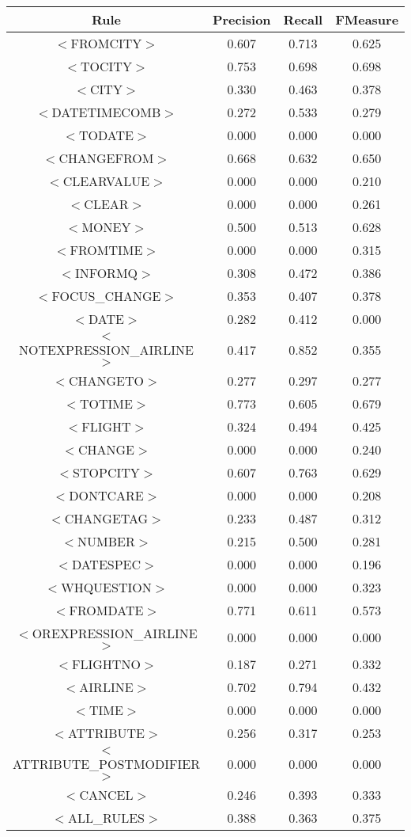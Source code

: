 \documentclass[a4paper,10pt]{article}
\begin{document}
\pagebreak
{} \label{tab:title} 
\begin{center}
\begin{tabular}{|c||c|c|c|}
\hline
Rule&Precision&Recall&FMeasure\\
\hline
\hline
$<$FROMCITY$>$&0.607&0.713&0.625 \\
\hline$<$TOCITY$>$&0.753&0.698&0.698 \\
\hline$<$CITY$>$&0.330&0.463&0.378 \\
\hline$<$DATETIMECOMB$>$&0.272&0.533&0.279 \\
\hline$<$TODATE$>$&0.000&0.000&0.000 \\
\hline$<$CHANGEFROM$>$&0.668&0.632&0.650 \\
\hline$<$CLEARVALUE$>$&0.000&0.000&0.210 \\
\hline$<$CLEAR$>$&0.000&0.000&0.261 \\
\hline$<$MONEY$>$&0.500&0.513&0.628 \\
\hline$<$FROMTIME$>$&0.000&0.000&0.315 \\
\hline$<$INFORMQ$>$&0.308&0.472&0.386 \\
\hline$<$FOCUS\_CHANGE$>$&0.353&0.407&0.378 \\
\hline$<$DATE$>$&0.282&0.412&0.000 \\
\hline$<$NOTEXPRESSION\_AIRLINE$>$&0.417&0.852&0.355 \\
\hline$<$CHANGETO$>$&0.277&0.297&0.277 \\
\hline$<$TOTIME$>$&0.773&0.605&0.679 \\
\hline$<$FLIGHT$>$&0.324&0.494&0.425 \\
\hline$<$CHANGE$>$&0.000&0.000&0.240 \\
\hline$<$STOPCITY$>$&0.607&0.763&0.629 \\
\hline$<$DONTCARE$>$&0.000&0.000&0.208 \\
\hline$<$CHANGETAG$>$&0.233&0.487&0.312 \\
\hline$<$NUMBER$>$&0.215&0.500&0.281 \\
\hline$<$DATESPEC$>$&0.000&0.000&0.196 \\
\hline$<$WHQUESTION$>$&0.000&0.000&0.323 \\
\hline$<$FROMDATE$>$&0.771&0.611&0.573 \\
\hline$<$OREXPRESSION\_AIRLINE$>$&0.000&0.000&0.000 \\
\hline$<$FLIGHTNO$>$&0.187&0.271&0.332 \\
\hline$<$AIRLINE$>$&0.702&0.794&0.432 \\
\hline$<$TIME$>$&0.000&0.000&0.000 \\
\hline$<$ATTRIBUTE$>$&0.256&0.317&0.253 \\
\hline$<$ATTRIBUTE\_POSTMODIFIER$>$&0.000&0.000&0.000 \\
\hline$<$CANCEL$>$&0.246&0.393&0.333 \\
\hline
\hline
$<$ALL\_RULES$>$&0.388&0.363&0.375 \\
\hline
\end{tabular}
\end{center}
\end{document}
